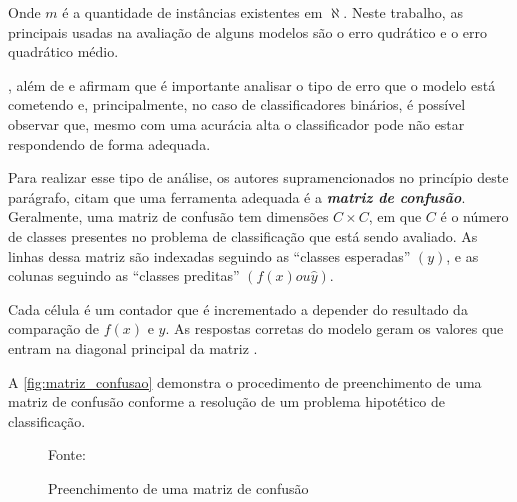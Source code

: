 Onde $m$ é a quantidade de instâncias existentes em $\aleph$. Neste trabalho, as principais usadas na avaliação de alguns modelos são o erro qudrático e o erro quadrático médio.

,  além de  e  afirmam que é importante analisar o tipo de erro que o modelo está cometendo e, principalmente, no caso de classificadores binários, é possível observar que, mesmo com uma acurácia alta o classificador pode não estar respondendo de forma adequada. 

Para realizar esse tipo de análise, os autores supramencionados no princípio deste parágrafo, citam que uma ferramenta adequada é a \textit{\textbf{matriz de confusão}}. Geralmente, uma matriz de confusão tem dimensões $C \times C$, em que $C$ é o número de classes presentes no problema de classificação que está sendo avaliado. As linhas dessa matriz são indexadas seguindo as ``classes esperadas'' $(y)$, e as colunas seguindo as ``classes preditas'' $(f(x) ou \hat{y})$. 

Cada célula é um contador que é incrementado a depender do resultado da comparação de $f(x)$ e $y$. As respostas corretas do modelo geram os valores que entram na diagonal principal da matriz \cite[p. 130]{Boscarioli2017}.

A \autoref{fig:matriz_confusao} demonstra o procedimento de preenchimento de uma matriz de confusão conforme a resolução de um problema hipotético de classificação.

\begin{figure}[h!]
	\centering
	\caption{Preenchimento de uma matriz de confusão}
	
	{\scriptsize Fonte: }
	\label{fig:matriz_confusao}
\end{figure}

